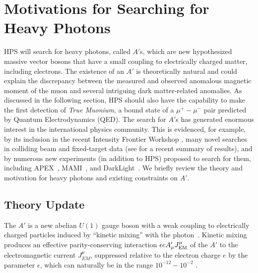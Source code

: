 
\newcommand{\MeV}{\rm MeV}
\section{Motivations for Searching for Heavy Photons}

HPS will search for heavy photons, called $A'$s, which are new hypothesized massive vector bosons that have a small coupling 
to electrically charged matter, including electrons.  
The existence of an $A'$ is theoretically natural and could explain the discrepancy between the measured and 
observed anomalous magnetic moment of the muon and several intriguing dark matter-related anomalies.  
As discussed in the following section, HPS should also have the capability to make the first detection of \emph{True Muonium}, a bound state of a 
$\mu^+ - \mu^-$ pair predicted by Quantum Electrodynamics (QED).  
The search for $A'$s has generated enormous interest in the international physics community.  This is evidenced, for example, 
by its inclusion in the recent Intensity Frontier Workshop \cite{Kamionkowski:2010mi,Hewett:2012ns}, 
many novel searches in colliding beam and fixed-target data (see \cite{Dark2012} for a recent summary of results),  
and by numerous new experiments (in addition to HPS) proposed to search for them, including 
APEX~\cite{Essig:2010xa,Abrahamyan:2011gv},  MAMI~\cite{Merkel:2011ze}, and DarkLight~\cite{Freytsis:2009bh}.
We briefly review the theory and motivation for heavy photons and existing constraints on $A'$.

\subsection{Theory Update}

The $A'$ is a new abelian $U(1)$ gauge boson with a weak coupling 
to electrically charged particles induced by ``kinetic mixing'' with the photon~\cite{Holdom:1985ag,Galison:1983pa}.  
Kinetic mixing produces an effective parity-conserving interaction
$\epsilon e A'_\mu J^\mu_{\rm EM}$ of the $A'$ to the 
electromagnetic current $J^\mu_{EM}$,  suppressed relative to the electron charge 
$e$ by the parameter $\epsilon$, which can naturally be in the range $10^{-12} -10^{-2}$ \cite{Essig:2009nc,Goodsell:2009xc,Cicoli:2011yh,Goodsell:2011wn}. 

